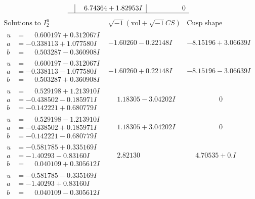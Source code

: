 \documentclass[1p]{elsarticle_modified}
\theoremstyle{definition}
\newcommand{\I}{\sqrt{-1}}
\begin{document}
$$\begin{array}{c|c|c}
 & \phantom{-}6.74364 + 1.82953 I & \phantom{-0.000000 } 0\\
 \hline 
 \end{array}$$\newpage$$\begin{array}{c|c|c}  
\text{Solutions to }I^u_{2}& \I (\text{vol} + \sqrt{-1}CS) & \text{Cusp shape}\\
 \hline 
\begin{aligned}
u &= \phantom{-}0.600197 + 0.312067 I \\
a &= -0.338113 + 1.077580 I \\
b &= \phantom{-}0.503287 - 0.360908 I\end{aligned}
 & -1.60260 - 0.22148 I & -8.15196 + 3.06639 I \\ \hline\begin{aligned}
u &= \phantom{-}0.600197 - 0.312067 I \\
a &= -0.338113 - 1.077580 I \\
b &= \phantom{-}0.503287 + 0.360908 I\end{aligned}
 & -1.60260 + 0.22148 I & -8.15196 - 3.06639 I \\ \hline\begin{aligned}
u &= \phantom{-}0.529198 + 1.213910 I \\
a &= -0.438502 - 0.185971 I \\
b &= -0.142221 + 0.680779 I\end{aligned}
 & \phantom{-}1.18305 - 3.04202 I & \phantom{-0.000000 } 0 \\ \hline\begin{aligned}
u &= \phantom{-}0.529198 - 1.213910 I \\
a &= -0.438502 + 0.185971 I \\
b &= -0.142221 - 0.680779 I\end{aligned}
 & \phantom{-}1.18305 + 3.04202 I & \phantom{-0.000000 } 0 \\ \hline\begin{aligned}
u &= -0.581785 + 0.335169 I \\
a &= -1.40293 - 0.83160 I \\
b &= \phantom{-}0.040109 + 0.305612 I\end{aligned}
 & \phantom{-}2.82130\phantom{ +0.000000I} & \phantom{-}4.70535 + 0. I\phantom{ +0.000000I} \\ \hline\begin{aligned}
u &= -0.581785 - 0.335169 I \\
a &= -1.40293 + 0.83160 I \\
b &= \phantom{-}0.040109 - 0.305612 I\end{aligned}

\end{array}$$
\end{document}
